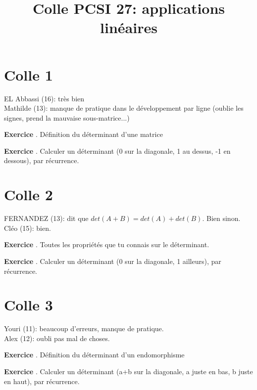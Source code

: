 \documentclass[10pt,a4paper]{article}
\title{Colle PCSI 27: applications linéaires}
\newcounter{question}
\newcounter{exo}
\newenvironment{exo}{\vspace{0.5cm}\setcounter{question}{0}\addtocounter{exo}{1} \noindent \textbf{Exercice \theexo}. \normalsize }{\par}
\begin{document}
	\maketitle
	
	\section*{Colle 1}

	\setcounter{exo}{0}
	EL Abbassi (16): très bien\\
	Mathilde (13): manque de pratique dans le développement par ligne (oublie les signes, prend la mauvaise sous-matrice...)
	
	\begin{exo}
		Définition du déterminant d'une matrice
	\end{exo}

	\begin{exo}
		Calculer un déterminant (0 sur la diagonale, 1 au dessus, -1 en dessous), par récurrence.
	\end{exo}	

	\section*{Colle 2}

	\setcounter{exo}{0}
	FERNANDEZ (13): dit que $det(A+B) = det(A) + det(B)$. Bien sinon.\\
	Cléo (15): bien.\\
	
	\begin{exo}
		Toutes les propriétés que tu connais sur le déterminant.
	\end{exo}
		
	\begin{exo}
		Calculer un déterminant (0 sur la diagonale, 1 ailleurs), par récurrence.
	\end{exo}	
	
	\section*{Colle 3}
	\setcounter{exo}{0}
	Youri (11): beaucoup d'erreurs, manque de pratique.\\
	Alex (12): oubli pas mal de choses.\\
	
	\begin{exo}
		Définition du déterminant d'un endomorphisme
	\end{exo}

	\begin{exo}
		Calculer un déterminant (a+b sur la diagonale, a juste en bas, b juste en haut), par récurrence.
	\end{exo}
\end{document}
